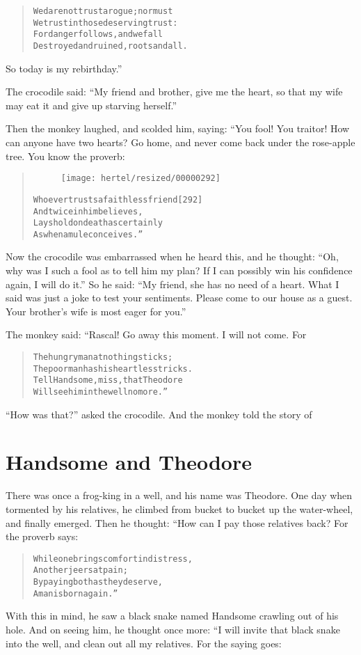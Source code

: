 \documentclass[article, twoside, 10pt]{memoir}
\renewenvironment{verbatim}{%
\begin{quote}%
\vskip -10pt%
\begin{alltt}\normalfont\small}{\end{alltt}%
\end{quote}%
\vskip -10pt
} %
\begin{document}
\begin{verbatim}
We dare not trust a rogue; nor must
We trust in those deserving trust:
For danger follows, and we fall
Destroyed and ruined, roots and all.
\end{verbatim}
So today is my rebirthday.”

The crocodile said:
``My friend and brother, give me the heart, so that my wife may eat it and give up starving herself.''

Then the monkey laughed, and scolded him, saying: “You fool! You
traitor! How can anyone have two hearts? Go home, and never come
back under the rose-apple tree. You know the proverb:

\begin{verbatim}
\begin{figure}[p]\texttt{[image: hertel/resized/00000292]}\end{figure}Whoever trusts a faithless friend                       [292]
    And twice in him believes,
Lays hold on death as certainly
    As when a mule conceives.”
\end{verbatim}
Now the crocodile was embarrassed when he heard this, and he
thought:
``Oh, why was I such a fool as to tell him my plan? If I can possibly win his confidence again, I will do it.''
So he said:
``My friend, she has no need of a heart. What I said was just a joke to test your sentiments. Please come to our house as a guest. Your brother's wife is most eager for you.''

The monkey said: “Rascal! Go away this moment. I will not come.
For

\begin{verbatim}
The hungry man at nothing sticks;
The poor man has his heartless tricks.
Tell Handsome, miss, that Theodore
Will see him in the well no more.”
\end{verbatim}
``How was that?'' asked the crocodile. And the monkey told the
story of

\chapter{Handsome and Theodore}

There was once a frog-king in a well, and his name was Theodore.
One day when tormented by his relatives, he climbed from bucket to
bucket up the water-wheel, and finally emerged. Then he thought:
“How can I pay those relatives back? For the proverb says:

\begin{verbatim}
While one brings comfort in distress,
    Another jeers at pain;
By paying both as they deserve,
    A man is born again.”
\end{verbatim}
With this in mind, he saw a black snake named Handsome crawling out
of his hole. And on seeing him, he thought once more: “I will
invite that black snake into the well, and clean out all my
relatives. For the saying goes:
\end{document}
